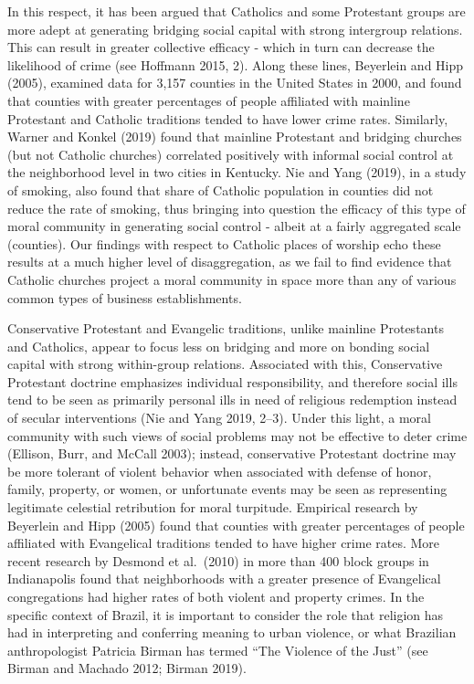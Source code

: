\documentclass[smallextended]{svjour3}       %
\begin{document}
In this respect, it has been argued that Catholics and some Protestant
groups are more adept at generating bridging social capital with strong
intergroup relations. This can result in greater collective efficacy -
which in turn can decrease the likelihood of crime (see Hoffmann 2015,
2). Along these lines, Beyerlein and Hipp (2005), examined data for
3,157 counties in the United States in 2000, and found that counties
with greater percentages of people affiliated with mainline Protestant
and Catholic traditions tended to have lower crime rates. Similarly,
Warner and Konkel (2019) found that mainline Protestant and bridging
churches (but not Catholic churches) correlated positively with informal
social control at the neighborhood level in two cities in Kentucky. Nie
and Yang (2019), in a study of smoking, also found that share of
Catholic population in counties did not reduce the rate of smoking, thus
bringing into question the efficacy of this type of moral community in
generating social control - albeit at a fairly aggregated scale
(counties). Our findings with respect to Catholic places of worship echo
these results at a much higher level of disaggregation, as we fail to
find evidence that Catholic churches project a moral community in space
more than any of various common types of business establishments.

Conservative Protestant and Evangelic traditions, unlike mainline
Protestants and Catholics, appear to focus less on bridging and more on
bonding social capital with strong within-group relations. Associated
with this, Conservative Protestant doctrine emphasizes individual
responsibility, and therefore social ills tend to be seen as primarily
personal ills in need of religious redemption instead of secular
interventions (Nie and Yang 2019, 2--3). Under this light, a moral
community with such views of social problems may not be effective to
deter crime (Ellison, Burr, and McCall 2003); instead, conservative
Protestant doctrine may be more tolerant of violent behavior when
associated with defense of honor, family, property, or women, or
unfortunate events may be seen as representing legitimate celestial
retribution for moral turpitude. Empirical research by Beyerlein and
Hipp (2005) found that counties with greater percentages of people
affiliated with Evangelical traditions tended to have higher crime
rates. More recent research by Desmond et al.~(2010) in more than 400
block groups in Indianapolis found that neighborhoods with a greater
presence of Evangelical congregations had higher rates of both violent
and property crimes. In the specific context of Brazil, it is important
to consider the role that religion has had in interpreting and
conferring meaning to urban violence, or what Brazilian anthropologist
Patricia Birman has termed ``The Violence of the Just'' (see Birman and
Machado 2012; Birman 2019).
\end{document}
